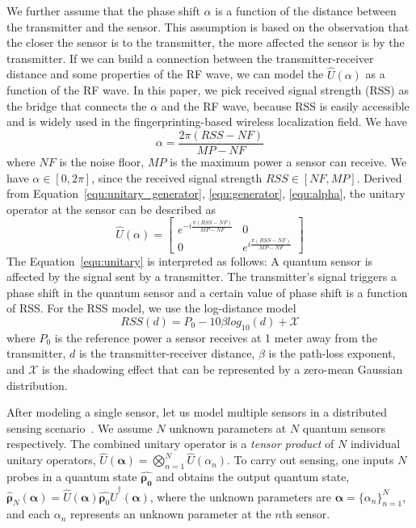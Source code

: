 We further assume that the phase shift $\alpha$ is a function of the distance between the transmitter and the sensor.
This assumption is based on the observation that the closer the sensor is to the transmitter, the more affected the sensor is by the transmitter.
If we can build a connection between the transmitter-receiver distance and some properties of the RF wave, we can model the $\hat{U}(\alpha)$ as a function of the RF wave.
In this paper, we pick received signal strength (RSS) as the bridge that connects the $\alpha$ and the RF wave, because RSS is easily accessible and is widely used in the fingerprinting-based wireless localization field.
We have
\begin{equation}
    \alpha = \frac{2\pi (RSS - NF)}{MP-NF}
    \label{equ:alpha}
\end{equation}
where $NF$ is the noise floor, $MP$ is the maximum power a sensor can receive. 
We have $\alpha \in [0, 2\pi]$, since the received signal strength $RSS \in [NF, MP]$.
Derived from Equation~\ref{equ:unitary_generator}, \ref{equ:generator}, \ref{equ:alpha}, the unitary operator at the sensor can be described as
\begin{equation}
    \hat{U}(\alpha)   = 
    \begin{bmatrix}
    e^{- i \frac{\pi (RSS - NF)}{MP-NF}} & 0\\
    0 & e^{ i \frac{\pi (RSS - NF)}{MP-NF}}
    \end{bmatrix}
    \label{equ:unitary}
\end{equation}
The Equation~\ref{equ:unitary} is interpreted as follows: A quantum sensor is affected by the signal sent by a transmitter.
The transmitter's signal triggers a phase shift in the quantum sensor and a certain value of phase shift is a function of RSS. 
For the RSS model, we use the log-distance model
\begin{equation}
    RSS(d) = P_0 - 10\beta log_{10}(d) + \mathcal{X}
    \label{equ:propagation}
\end{equation}
where $P_0$ is the reference power a sensor receives at 1 meter away from the transmitter, $d$ is the transmitter-receiver distance, $\beta$ is the path-loss exponent, and $\mathcal{X}$ is the shadowing effect that can be represented by a zero-mean Gaussian distribution.

After modeling a single sensor, let us model multiple sensors in a distributed sensing scenario~\cite{Zhang_2021}.
We assume $N$ unknown parameters at $N$ quantum sensors respectively. 
The combined unitary operator is a \emph{tensor product} of $N$ individual unitary operators,
$\hat{U}(\boldsymbol{\alpha}) = \bigotimes_{n=1}^{N} \hat{U}(\alpha_n)$.
To carry out sensing, one inputs $N$ probes in a quantum state $\hat{\boldsymbol{\rho_0}}$ and obtains the output quantum state,
$\hat{\boldsymbol{\rho}}_N({\boldsymbol{\alpha}}) = \hat{U}(\boldsymbol{\alpha}) \hat{\boldsymbol{\rho}_0} \hat{U}^{\dagger}(\boldsymbol{\alpha})$,
where the unknown parameters are $\boldsymbol{\alpha}=\{\alpha_n\}_{n=1}^{N}$, and each $\alpha_n$ represents an unknown parameter at the $n$th sensor. 


